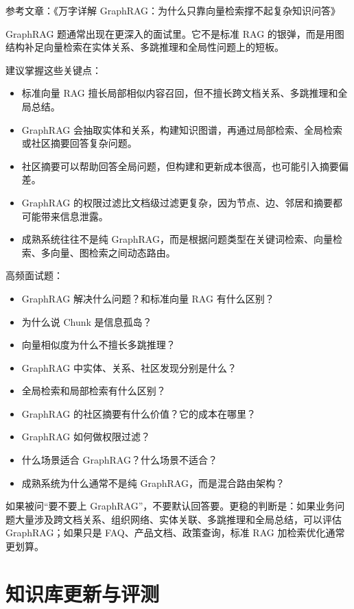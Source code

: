 \documentclass[9pt,a4paper,twocolumn]{ctexart}
\begin{document}
参考文章：《万字详解 GraphRAG：为什么只靠向量检索撑不起复杂知识问答》



GraphRAG 题通常出现在更深入的面试里。它不是标准 RAG 的银弹，而是用图结构补足向量检索在实体关系、多跳推理和全局性问题上的短板。



建议掌握这些关键点：


\begin{itemize}[itemsep=1pt, topsep=2pt]
  \item 标准向量 RAG 擅长局部相似内容召回，但不擅长跨文档关系、多跳推理和全局总结。
  \item GraphRAG 会抽取实体和关系，构建知识图谱，再通过局部检索、全局检索或社区摘要回答复杂问题。
  \item 社区摘要可以帮助回答全局问题，但构建和更新成本很高，也可能引入摘要偏差。
  \item GraphRAG 的权限过滤比文档级过滤更复杂，因为节点、边、邻居和摘要都可能带来信息泄露。
  \item 成熟系统往往不是纯 GraphRAG，而是根据问题类型在关键词检索、向量检索、多向量、图检索之间动态路由。
\end{itemize}


高频面试题：


\begin{itemize}[itemsep=1pt, topsep=2pt]
  \item GraphRAG 解决什么问题？和标准向量 RAG 有什么区别？
  \item 为什么说 Chunk 是信息孤岛？
  \item 向量相似度为什么不擅长多跳推理？
  \item GraphRAG 中实体、关系、社区发现分别是什么？
  \item 全局检索和局部检索有什么区别？
  \item GraphRAG 的社区摘要有什么价值？它的成本在哪里？
  \item GraphRAG 如何做权限过滤？
  \item 什么场景适合 GraphRAG？什么场景不适合？
  \item 成熟系统为什么通常不是纯 GraphRAG，而是混合路由架构？
\end{itemize}


如果被问“要不要上 GraphRAG”，不要默认回答要。更稳的判断是：如果业务问题大量涉及跨文档关系、组织网络、实体关联、多跳推理和全局总结，可以评估 GraphRAG；如果只是 FAQ、产品文档、政策查询，标准 RAG 加检索优化通常更划算。



\section*{知识库更新与评测}
\end{document}
